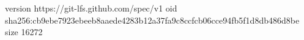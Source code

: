 version https://git-lfs.github.com/spec/v1
oid sha256:cb9ebe7923ebeeb8aaede4283b12a37fa9c8ccfcb06cce94fb5f1d8db486d8be
size 16272
